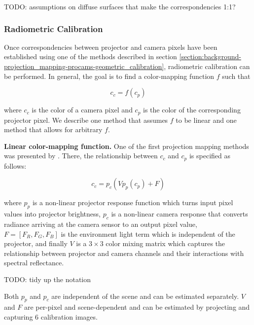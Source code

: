 {\color{red} TODO: assumptions on diffuse surfaces that make the correspondencies 1:1?}

\subsubsection{Radiometric Calibration}
\label{section:background-projection_mapping-procams-radiometric_calibration}

Once correspondencies between projector and camera pixels have been established using one of the methods described in section \ref{section:background-projection_mapping-procams-geometric_calibration}, radiometric calibration can be performed. In general, the goal is to find a color-mapping function \(f\) such that

\begin{equation}
    \label{eq:radiometric_calibration}
    c_c = f(c_p)
\end{equation}

where \(c_c\) is the color of a camera pixel and \(c_p\) is the color of the corresponding projector pixel. We describe one method that assumes \(f\) to be linear and one method that allows for arbitrary \(f\).

\textbf{Linear color-mapping function.} One of the first projection mapping methods was presented by \citet{Grossberg2004}. There, the relationship between \(c_c\) and \(c_p\) is specified as follows:

\begin{equation}
    \label{eq:linear_color_mapping}
    c_c = p_c(V p_p(c_p) + F)
\end{equation}

where \(p_p\) is a non-linear projector response function which turns input pixel values into projector brightness, \(p_c\) is a non-linear camera response that converts radiance arriving at the camera sensor to an output pixel value, \(F = [F_R, F_G, F_B]\) is the environment light term which is independent of the projector, and finally \(V\) is a \(3 \times 3\) color mixing matrix which captures the relationship between projector and camera channels and their interactions with spectral reflectance.

{\color{red} TODO: tidy up the notation}

Both \(p_p\) and \(p_c\) are independent of the scene and can be estimated separately. \(V\) and \(F\) are per-pixel and scene-dependent and can be estimated by projecting and capturing 6 calibration images.


